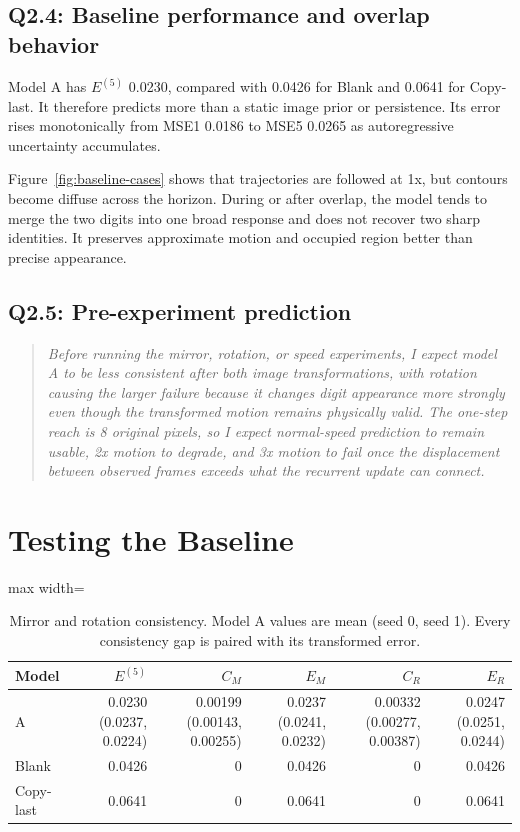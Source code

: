 \documentclass{article}
\newcommand{\Efive}{\ensuremath{E^{(5)}}}
\newcommand{\CM}{\ensuremath{C_M}}
\newcommand{\CR}{\ensuremath{C_R}}
\newcommand{\EM}{\ensuremath{E_M}}
\newcommand{\ER}{\ensuremath{E_R}}
\begin{document}
\subsection*{Q2.4: Baseline performance and overlap behavior}

Model A has \Efive{} 0.0230, compared with 0.0426 for Blank and 0.0641 for Copy-last. It therefore predicts more than a static image prior or persistence. Its error rises monotonically from MSE1 0.0186 to MSE5 0.0265 as autoregressive uncertainty accumulates.

Figure~\ref{fig:baseline-cases} shows that trajectories are followed at 1x, but contours become diffuse across the horizon. During or after overlap, the model tends to merge the two digits into one broad response and does not recover two sharp identities. It preserves approximate motion and occupied region better than precise appearance.

\subsection*{Q2.5: Pre-experiment prediction}

\begin{quote}
\itshape
Before running the mirror, rotation, or speed experiments, I expect model A to be less consistent after both image transformations, with rotation causing the larger failure because it changes digit appearance more strongly even though the transformed motion remains physically valid. The one-step reach is 8 original pixels, so I expect normal-speed prediction to remain usable, 2x motion to degrade, and 3x motion to fail once the displacement between observed frames exceeds what the recurrent update can connect.
\end{quote}

\section{Testing the Baseline}
\label{sec:q2-tests}

\begin{table}[htbp]
\centering
\caption{Mirror and rotation consistency. Model A values are mean (seed 0, seed 1). Every consistency gap is paired with its transformed error.}
\label{tab:consistency}
\footnotesize
\begin{adjustbox}{max width=\linewidth}
\begin{tabular}{lrrrrr}
\toprule
Model & \Efive & \CM & \EM & \CR & \ER \\
\midrule
A & 0.0230 (0.0237, 0.0224) & 0.00199 (0.00143, 0.00255) & 0.0237 (0.0241, 0.0232) & 0.00332 (0.00277, 0.00387) & 0.0247 (0.0251, 0.0244) \\
Blank & 0.0426 & 0 & 0.0426 & 0 & 0.0426 \\
Copy-last & 0.0641 & 0 & 0.0641 & 0 & 0.0641 \\
\bottomrule
\end{tabular}
\end{adjustbox}
\end{table}
\end{document}
